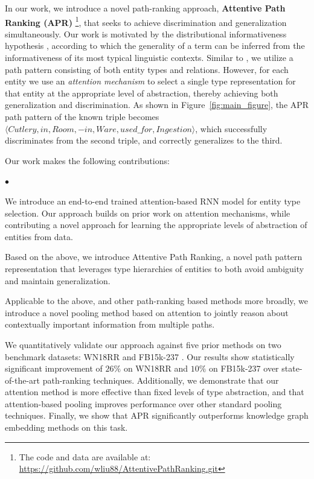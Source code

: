 \documentclass[letterpaper]{article} %
\newenvironment{flushitemize}{%
\begin{list}{$\bullet$}
   {\setlength{\leftmargin}{15pt}}%
    \setlength{\labelwidth}{20pt}
    \setlength{\itemindent}{0pt}
    \setlength{\labelsep}{0.5em}
 \setlength{\itemsep}{1pt}
 \setlength{\parskip}{0pt}
 \setlength{\parsep}{0pt}}
 {\end{list}}
\begin{document}
In our work, we introduce a novel path-ranking approach, \textbf{Attentive Path Ranking (APR)} \footnote{The code and data are available at: \url{https://github.com/wliu88/AttentivePathRanking.git}}, that seeks to achieve discrimination and generalization simultaneously.  Our work is motivated by the distributional informativeness hypothesis \cite{santus2014hypernym}, according to which the generality of a term can be inferred from the informativeness of its most typical linguistic contexts.
Similar to \cite{chains}, we utilize a path pattern consisting of both entity types and relations.  However, for each entity
we use an \textit{attention mechanism} \cite{ntm} to select a single type representation for that entity at the appropriate level of abstraction, thereby achieving both generalization and discrimination. As shown in Figure~\ref{fig:main_figure}, the APR path pattern of the known triple becomes $\langle Cutlery, in, Room, -in, Ware, used\_for, Ingestion \rangle$, which successfully discriminates from the second triple, and correctly generalizes to the third.


Our work makes the following contributions:
\begin{flushitemize}
    \item We introduce an end-to-end trained attention-based RNN model for entity type selection. Our approach builds on prior work on attention mechanisms, while contributing a novel approach for learning the appropriate levels of abstraction of entities from data.
    \item Based on the above, we introduce Attentive Path Ranking, a novel path pattern representation that leverages type hierarchies of entities to both avoid ambiguity and maintain generalization.
    \item Applicable to the above, and other path-ranking based methods more broadly, we introduce a novel pooling method based on attention to jointly reason about contextually important information from multiple paths.
\end{flushitemize}
We quantitatively validate our approach against five prior methods on two benchmark datasets: WN18RR \cite{wn18rr} and FB15k-237 \cite{fb15k-237}.  Our results show statistically significant improvement of $26\%$ on WN18RR and $10\%$ on FB15k-237 over state-of-the-art path-ranking techniques.  Additionally, we demonstrate that our attention method is more effective than fixed levels of type abstraction, and that attention-based pooling improves performance over other standard pooling techniques.  Finally, we show that APR significantly outperforms knowledge graph embedding methods on this task.
\end{document}
